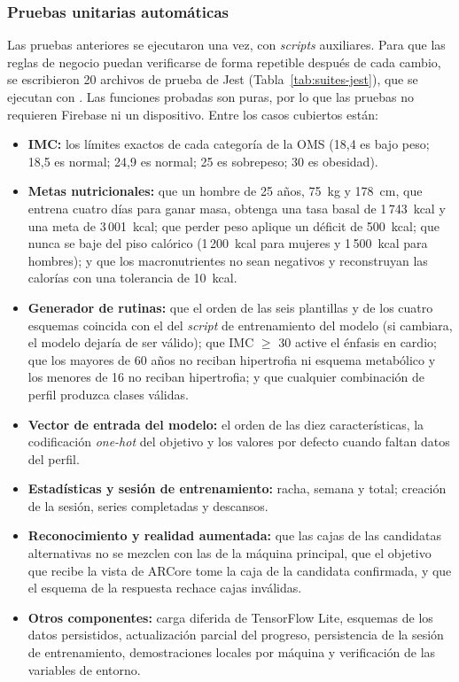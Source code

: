 \subsubsection{Pruebas unitarias automáticas}
\label{sec:pruebas-unitarias}

Las pruebas anteriores se ejecutaron una vez, con \emph{scripts} auxiliares.
Para que las reglas de negocio puedan verificarse de forma repetible después de
cada cambio, se escribieron 20 archivos de prueba de Jest
(Tabla~\ref{tab:suites-jest}), que se ejecutan con . Las
funciones probadas son puras, por lo que las pruebas no requieren Firebase ni
un dispositivo. Entre los casos cubiertos están:

\begin{itemize}
    \item \textbf{IMC:} los límites exactos de cada categoría de la OMS
    (18,4 es bajo peso; 18,5 es normal; 24,9 es normal; 25 es sobrepeso; 30 es
    obesidad).
    \item \textbf{Metas nutricionales:} que un hombre de 25 años, 75~kg y
    178~cm, que entrena cuatro días para ganar masa, obtenga una tasa basal de
    1\,743~kcal y una meta de 3\,001~kcal; que perder peso aplique un déficit de
    500~kcal; que nunca se baje del piso calórico (1\,200~kcal para mujeres y
    1\,500~kcal para hombres); y que los macronutrientes no sean negativos y
    reconstruyan las calorías con una tolerancia de 10~kcal.
    \item \textbf{Generador de rutinas:} que el orden de las seis plantillas y
    de los cuatro esquemas coincida con el del \emph{script} de entrenamiento
    del modelo (si cambiara, el modelo dejaría de ser válido); que IMC $\geq$ 30
    active el énfasis en cardio; que los mayores de 60 años no reciban
    hipertrofia ni esquema metabólico y los menores de 16 no reciban
    hipertrofia; y que cualquier combinación de perfil produzca clases
    válidas.
    \item \textbf{Vector de entrada del modelo:} el orden de las diez
    características, la codificación \emph{one-hot} del objetivo y los valores
    por defecto cuando faltan datos del perfil.
    \item \textbf{Estadísticas y sesión de entrenamiento:} racha, semana y
    total; creación de la sesión, series completadas y descansos.
    \item \textbf{Reconocimiento y realidad aumentada:} que las cajas de las
    candidatas alternativas no se mezclen con las de la máquina principal, que
    el objetivo que recibe la vista de ARCore tome la caja de la candidata
    confirmada, y que el esquema de la respuesta rechace cajas inválidas.
    \item \textbf{Otros componentes:} carga diferida de TensorFlow Lite,
    esquemas de los datos persistidos, actualización parcial del progreso,
    persistencia de la sesión de entrenamiento, demostraciones locales por
    máquina y verificación de las variables de entorno.
\end{itemize}

